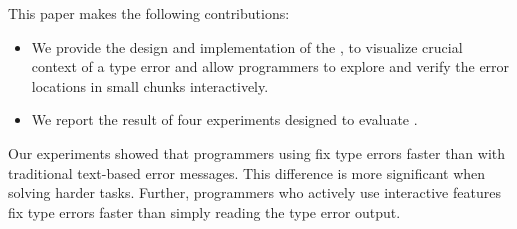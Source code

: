 This paper makes the following contributions:
\begin{itemize}
\item { We provide the design and implementation of the \chameleon{}, to visualize crucial context of a type error and allow programmers to explore and verify the error locations in small chunks interactively.  }
\item {
    We report the result of four experiments designed to evaluate \chameleon{}.}
\end{itemize}

Our experiments showed that programmers using \chameleon{} fix type errors faster than with traditional text-based error messages. This difference is more significant when solving harder tasks. Further, programmers who actively use \chameleon{} interactive features fix type errors faster than simply reading the type error output.

